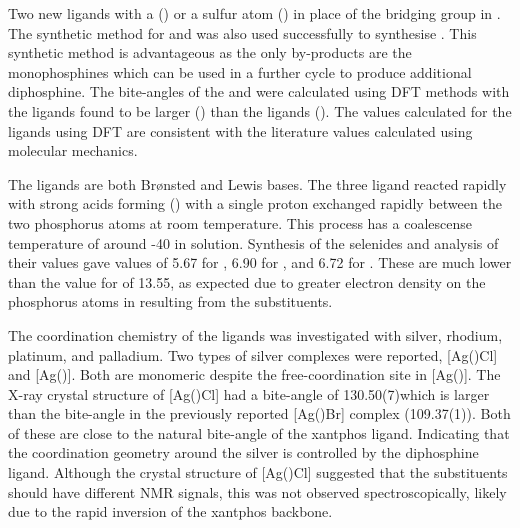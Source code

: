 Two new \tBuxantphos{} ligands with a  (\tBusixantphos) or a sulfur atom (\tButhixantphos) in place of the  bridging group in \tBuxantphos.  The synthetic method for \tBusixantphos{} and \tButhixantphos{} was also used successfully to synthesise \tBuxantphos{}.  This synthetic method is advantageous as the only by-products are the monophosphines which can be used in a further cycle to produce additional diphosphine.  The bite-angles of the \tBuxantphos{} and \Phxantphos{} were calculated using \gls{DFT} methods with the \tBuxantphos{} ligands found to be larger () than the \Phxantphos{} ligands ().  The values calculated for the \Phxantphos{} ligands using DFT are consistent with the literature values calculated using molecular mechanics.  

The \tBuxantphos{} ligands are both Br\o nsted and Lewis bases.  The three ligand reacted rapidly with strong acids forming (\tBuxantphos) with a single proton exchanged rapidly between the two phosphorus atoms at room temperature.  This process has a coalescense temperature of around -40 \degC{} in solution.  Synthesis of the \tBuxantphos{} selenides and analysis of their \JPSe{} values gave \pKb{} values of 5.67 for \tBusixantphos, 6.90 for \tButhixantphos{}, and 6.72 for \tBuxantphos{}.  These are much lower than the value for \tBuxantphos{} of 13.55, as expected due to greater electron density on the phosphorus atoms in \tBuxantphos{} resulting from the \tBu{} substituents.  

The coordination chemistry of the \tBuxantphos{} ligands was investigated with silver, rhodium, platinum, and palladium.  Two types of silver complexes were reported, [Ag(\tBuxantphos)Cl] and [Ag(\tBuxantphos)].  Both are monomeric despite the free-coordination site in [Ag(\tBuxantphos)].  The X-ray crystal structure of [Ag(\tButhixantphos)Cl] had a bite-angle of 130.50(7)\degrees{}which is larger than the bite-angle in the previously reported [Ag(\Phxantphos)Br] complex (109.37(1)\degrees{}).  Both of these are close to the natural bite-angle of the xantphos ligand.  Indicating that the coordination geometry around the silver is controlled by the diphosphine ligand.  Although the crystal structure of [Ag(\tButhixantphos)Cl] suggested that the \tBu{} substituents should have different NMR signals, this was not observed spectroscopically, likely due to the rapid inversion of the xantphos backbone.  

